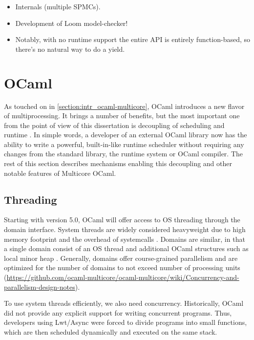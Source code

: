 \documentclass[12pt,a4paper,twoside]{report}
\begin{document}
\begin{itemize}
    \item Internals (multiple SPMCs).
    \item Development of Loom model-checker!
    \item Notably, with no runtime support the entire API is entirely function-based, so there's no natural way to do a yield. 
\end{itemize}


\section{OCaml}
\label{section:background_ocaml}

As touched on in \ref{section:intr_ocaml-multicore}, OCaml introduces a new flavor of multiprocessing. It brings a number of benefits, but the most important one from the point of view of this dissertation is decoupling of scheduling and runtime \cite{stephen_effective_nodate}. In simple words, a developer of an external OCaml library now has the ability to write a powerful, built-in-like runtime scheduler without requiring any changes from the standard library, the runtime system or OCaml compiler. The rest of this section describes mechanisms enabling this decoupling and other notable features of Multicore OCaml.

\subsection{Threading}
\label{section:fibers}
Starting with version 5.0, OCaml will offer access to OS threading through the domain interface. System threads are widely considered heavyweight due to high memory footprint and the overhead of systemcalls . Domains are similar, in that a single domain consist of an OS thread and additional OCaml structures such as local minor heap \cite{Sivaramakrishnan2020}. Generally, domains offer course-grained parallelism and are optimized for the number of domains to not exceed number of processing units (\url{https://github.com/ocaml-multicore/ocaml-multicore/wiki/Concurrency-and-parallelism-design-notes}).

To use system threads efficiently, we also need concurrency. Historically, OCaml did not provide any explicit support for writing concurrent programs. Thus, developers using Lwt/Async were forced to divide programs into small functions, which are then scheduled dynamically and executed on the same stack. 
\end{document}
